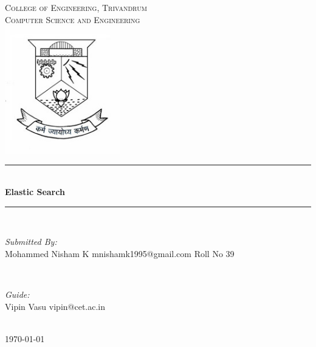 \documentclass[12pt]{article}
\begin{document}
	\begin{titlepage}
		\newcommand{\HRule}{\rule{\linewidth}{0.5mm}} %
		\center %
		 

		\textsc{\LARGE College of Engineering, Trivandrum}\\[1.5cm] %
		\textsc{\Large Computer Science and Engineering}\\[0.5cm] %
		\includegraphics[width=5cm]{images/cet_emblem.jpg} 

		\HRule \\[0.4cm]
		{ \huge \bfseries Elastic Search}\\[0.4cm] %
		\HRule \\[1.5cm]

		\begin{minipage}{0.4\textwidth}
		\begin{flushleft} \large
		\emph{Submitted By:}\\
		Mohammed Nisham K %
		mnishamk1995@gmail.com
		Roll No 39
		\end{flushleft}
		\end{minipage}
		~
		\begin{minipage}{0.4\textwidth}
		\begin{flushright} \large
		\emph{Guide:} \\
		Vipin Vasu
		vipin@cet.ac.in %
		\end{flushright}
		\end{minipage}\\[2cm]

		{\large \today}\\[1cm] %

		\vfill %
	\end{titlepage}
\end{document}
